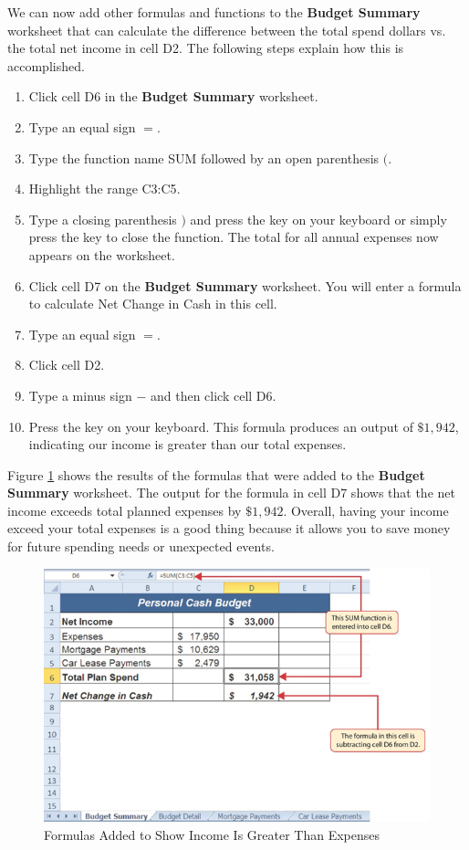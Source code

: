 We can now add other formulas and functions to the \textbf{Budget Summary} worksheet that can calculate the difference between the total spend dollars vs. the total net income in cell \textsf{D2}. The following steps explain how this is accomplished.

\begin{enumerate}
	\item Click cell \textsf{D6} in the \textbf{Budget Summary} worksheet.
	\item Type an equal sign $ = $.
	\item Type the function name SUM followed by an open parenthesis $ ( $.
	\item Highlight the range \textsf{C3:C5}.
	\item Type a closing parenthesis $ ) $ and press the  key on your keyboard or simply press the  key to close the function. The total for all annual expenses now appears on the worksheet.
	\item Click cell \textsf{D7} on the \textbf{Budget Summary} worksheet. You will enter a formula to calculate Net Change in Cash in this cell.
	\item Type an equal sign $ = $.
	\item Click cell \textsf{D2}.
	\item Type a minus sign $ - $ and then click cell \textsf{D6}.
	\item Press the  key on your keyboard. This formula produces an output of $ \$1,942 $, indicating our income is greater than our total expenses.
\end{enumerate}

Figure \ref{02:fig38} shows the results of the formulas that were added to the \textbf{Budget Summary} worksheet. The output for the formula in cell \textsf{D7} shows that the net income exceeds total planned expenses by $ \$1,942 $. Overall, having your income exceed your total expenses is a good thing because it allows you to save money for future spending needs or unexpected events.

\begin{figure}[H]
	\centering
	\includegraphics[width=\maxwidth{.95\linewidth}]{gfx/ch02_fig38}
	\caption{Formulas Added to Show Income Is Greater Than Expenses}
	\label{02:fig38}
\end{figure}

